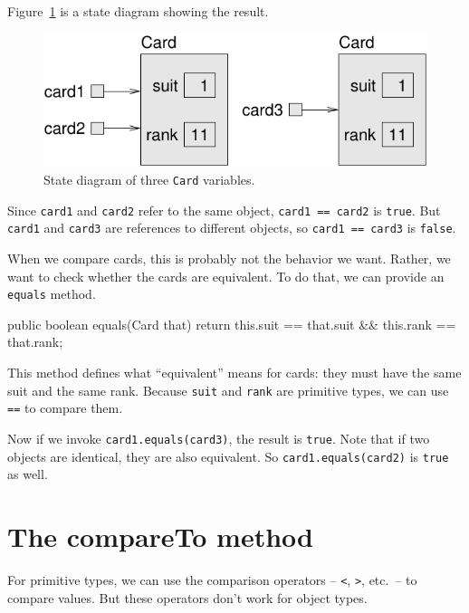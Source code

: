 \documentclass[12pt]{book}
\theoremstyle{exercise}
\newcommand{\java}[1]{\verb"#1"}
\begin{document}
Figure~\ref{fig.card} is a state diagram showing the result.

\begin{figure}
\begin{center}
\includegraphics{figs/card.pdf}
\caption{State diagram of three \java{Card} variables.}
\label{fig.card}
\end{center}
\end{figure}

Since \java{card1} and \java{card2} refer to the same object, \java{card1 == card2} is \java{true}.
But \java{card1} and \java{card3} are references to different objects, so \java{card1 == card3} is \java{false}.

When we compare cards, this is probably not the behavior we want.
Rather, we want to check whether the cards are equivalent.
To do that, we can provide an \java{equals} method.


\begin{code}
    public boolean equals(Card that) {
        return this.suit == that.suit && this.rank == that.rank;
    }
\end{code}

This method defines what ``equivalent'' means for cards: they must have the same suit and the same rank.
Because \java{suit} and \java{rank} are primitive types, we can use \java{==} to compare them.

Now if we invoke \java{card1.equals(card3)}, the result is \java{true}.
Note that if two objects are identical, they are also equivalent.
So \java{card1.equals(card2)} is \java{true} as well.


\section{The compareTo method}
\label{compare}


For primitive types, we can use the comparison operators -- \java{<}, \java{>}, etc.\ -- to compare values.
But these operators don't work for object types.
\end{document}
